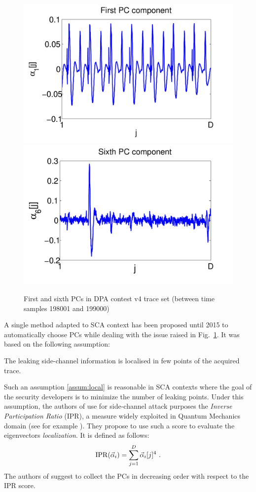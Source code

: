 \begin{figure}
\includegraphics[width=.45\textwidth]{../Figures/CARDIS2015/DPAcontestPC1_new.pdf} 
\includegraphics[width=.45\textwidth]{../Figures/CARDIS2015/DPAcontestPC6_new.pdf} 
\caption[First and sixth PCs in DPA contest v4 trace set.]{First and sixth PCs in DPA contest v4 trace set (between time samples 198001 and 199000)}\label{fig:DPAcontest}
\end{figure}
A single method adapted to SCA context has been proposed until 2015 to automatically choose PCs \cite{SCAclassProbl} while dealing with the issue raised in Fig.~\ref{fig:DPAcontest}. It was based on the following assumption:
\begin{assumption}\label{assum:local}
The leaking side-channel information is localised in few points of the acquired trace.
\end{assumption}
Such an assumption \ref{assum:local} is reasonable in SCA contexts where the goal of the security developers is to minimize the number of leaking points.
Under this assumption, the authors of \cite{SCAclassProbl} use for side-channel attack purposes the {\em Inverse Participation Ratio} (IPR), a measure widely exploited in Quantum Mechanics domain (see for example \cite{guhr1998random}). They propose to use such a score to evaluate the eigenvectors {\em localization}. It is defined as follows:
\begin{equation}
\mathrm{IPR}(\vec{\alpha}_i) = \sum_{j=1}^D \vec{\alpha}_i[j]^4 \mbox{ .}
\end{equation}
The authors of \cite{SCAclassProbl} suggest to collect the PCs in decreasing order with respect to the IPR score.\\

